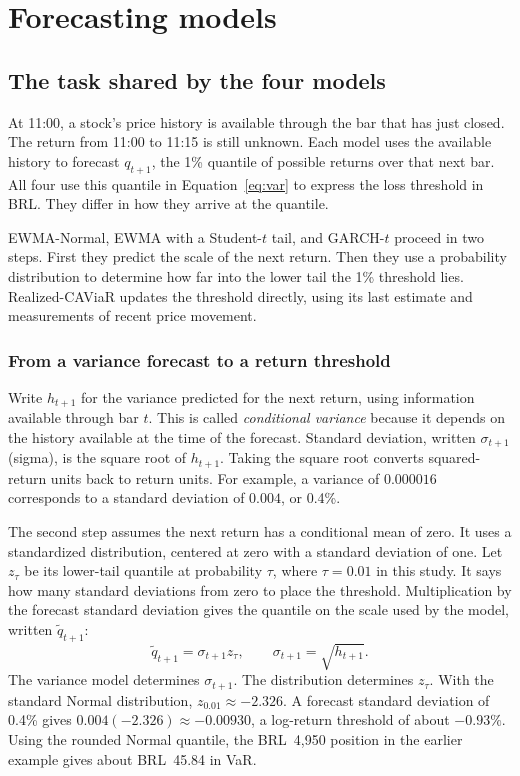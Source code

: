 \documentclass[
	12pt,				%
	openright,			%
	twoside,			%
	a4paper,
	chapter=TITLE,
	english				%
	]{abntex2}
\begin{document}
\section{Forecasting models} \label{sec:modelos}

\subsection{The task shared by the four models}

At 11:00, a stock's price history is available through the bar that has just closed. The return from 11:00 to 11:15 is still unknown. Each model uses the available history to forecast $q_{t+1}$, the 1\% quantile of possible returns over that next bar. All four use this quantile in Equation~\ref{eq:var} to express the loss threshold in BRL. They differ in how they arrive at the quantile.

EWMA-Normal, EWMA with a Student-$t$ tail, and GARCH-$t$ proceed in two steps. First they predict the scale of the next return. Then they use a probability distribution to determine how far into the lower tail the 1\% threshold lies. Realized-CAViaR updates the threshold directly, using its last estimate and measurements of recent price movement.

\subsubsection{From a variance forecast to a return threshold}

Write $h_{t+1}$ for the variance predicted for the next return, using information available through bar $t$. This is called \emph{conditional variance} because it depends on the history available at the time of the forecast. Standard deviation, written $\sigma_{t+1}$ (sigma), is the square root of $h_{t+1}$. Taking the square root converts squared-return units back to return units. For example, a variance of $0.000016$ corresponds to a standard deviation of $0.004$, or 0.4\%.

The second step assumes the next return has a conditional mean of zero. It uses a standardized distribution, centered at zero with a standard deviation of one. Let $z_\tau$ be its lower-tail quantile at probability $\tau$, where $\tau=0.01$ in this study. It says how many standard deviations from zero to place the threshold. Multiplication by the forecast standard deviation gives the quantile on the scale used by the model, written $\widetilde q_{t+1}$:
\begin{equation}
  \widetilde q_{t+1}=\sigma_{t+1}z_\tau,\qquad
  \sigma_{t+1}=\sqrt{h_{t+1}}.
  \label{eq:scaled-quantile}
\end{equation}
The variance model determines $\sigma_{t+1}$. The distribution determines $z_\tau$. With the standard Normal distribution, $z_{0.01}\approx-2.326$. A forecast standard deviation of 0.4\% gives $0.004(-2.326)\approx-0.00930$, a log-return threshold of about $-0.93\%$. Using the rounded Normal quantile, the BRL~4,950 position in the earlier example gives about BRL~45.84 in VaR.
\end{document}
